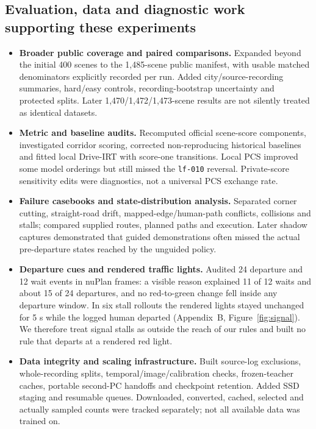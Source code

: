 \subsection{Evaluation, data and diagnostic work supporting these experiments}
\begin{itemize}\setlength{\itemsep}{3pt}\setlength{\parsep}{0pt}\setlength{\parskip}{0pt}\setlength{\topsep}{3pt}
\item \textbf{Broader public coverage and paired comparisons.} Expanded beyond the initial 400 scenes to the 1,485-scene public manifest, with usable matched denominators explicitly recorded per run. Added city/source-recording summaries, hard/easy controls, recording-bootstrap uncertainty and protected splits. Later 1,470/1,472/1,473-scene results are not silently treated as identical datasets.
\item \textbf{Metric and baseline audits.} Recomputed official scene-score components, investigated corridor scoring, corrected non-reproducing historical baselines and fitted local Drive-IRT \cite{driveirt} with score-one transitions. Local PCS improved some model orderings but still missed the \texttt{lf-010} reversal. Private-score sensitivity edits were diagnostics, not a universal PCS exchange rate.
\item \textbf{Failure casebooks and state-distribution analysis.} Separated corner cutting, straight-road drift, mapped-edge/human-path conflicts, collisions and stalls; compared supplied routes, planned paths and execution. Later shadow captures demonstrated that guided demonstrations often missed the actual pre-departure states reached by the unguided policy.
\item \textbf{Departure cues and rendered traffic lights.} Audited 24 departure and 12 wait events in nuPlan frames: a visible reason explained 11 of 12 waits and about 15 of 24 departures, and no red-to-green change fell inside any departure window. In six stall rollouts the rendered lights stayed unchanged for 5 s while the logged human departed (Appendix~B, Figure~\ref{fig:signal}). We therefore treat signal stalls as outside the reach of our rules and built no rule that departs at a rendered red light.
\item \textbf{Data integrity and scaling infrastructure.} Built source-log exclusions, whole-recording splits, temporal/image/calibration checks, frozen-teacher caches, portable second-PC handoffs and checkpoint retention. Added SSD staging and resumable queues. Downloaded, converted, cached, selected and actually sampled counts were tracked separately; not all available data was trained on.
\end{itemize}

